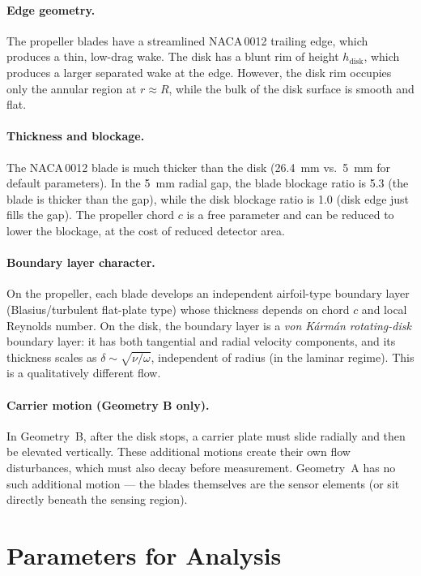 \documentclass[11pt,a4paper]{article}
\begin{document}
\paragraph{Edge geometry.}
The propeller blades have a streamlined NACA\,0012 trailing edge, which
produces a thin, low-drag wake. The disk has a blunt rim of height
$h_\mathrm{disk}$, which produces a larger separated wake at the edge.
However, the disk rim occupies only the annular region at
$r \approx R$, while the bulk of the disk surface is smooth and flat.

\paragraph{Thickness and blockage.}
The NACA\,0012 blade is much thicker than the disk
(\SI{26.4}{mm} vs.\ \SI{5}{mm} for default parameters). In the
\SI{5}{mm} radial gap, the blade blockage ratio is 5.3 (the blade is
thicker than the gap), while the disk blockage ratio is 1.0 (disk edge
just fills the gap). The propeller chord $c$ is a free parameter and
can be reduced to lower the blockage, at the cost of reduced detector
area.

\paragraph{Boundary layer character.}
On the propeller, each blade develops an independent airfoil-type
boundary layer (Blasius/turbulent flat-plate type) whose thickness
depends on chord $c$ and local Reynolds number. On the disk, the
boundary layer is a \emph{von K\'arm\'an rotating-disk} boundary layer:
it has both tangential and radial velocity components, and its thickness
scales as $\delta \sim \sqrt{\nu/\omega}$, independent of radius
(in the laminar regime). This is a qualitatively different flow.

\paragraph{Carrier motion (Geometry B only).}
In Geometry~B, after the disk stops, a carrier plate must slide
radially and then be elevated vertically. These additional motions
create their own flow disturbances, which must also decay before
measurement. Geometry~A has no such additional motion --- the blades
themselves are the sensor elements (or sit directly beneath the sensing
region).


\section{Parameters for Analysis}
\label{sec:params}
\end{document}
